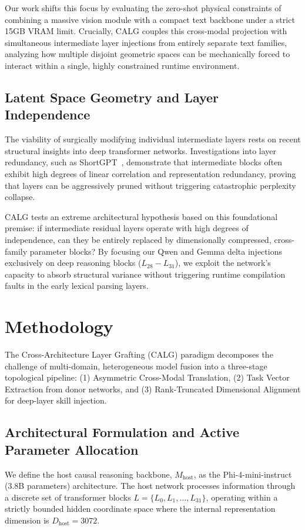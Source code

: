 \documentclass[11pt]{article}
\begin{document}
Our work shifts this focus by evaluating the zero-shot physical constraints of combining a massive vision module with a compact text backbone under a strict 15GB VRAM limit. Crucially, CALG couples this cross-modal projection with simultaneous intermediate layer injections from entirely separate text families, analyzing how multiple disjoint geometric spaces can be mechanically forced to interact within a single, highly constrained runtime environment.

\subsection{Latent Space Geometry and Layer Independence}
The viability of surgically modifying individual intermediate layers rests on recent structural insights into deep transformer networks. Investigations into layer redundancy, such as ShortGPT~\cite{men2024shortgpt}, demonstrate that intermediate blocks often exhibit high degrees of linear correlation and representation redundancy, proving that layers can be aggressively pruned without triggering catastrophic perplexity collapse. 

CALG tests an extreme architectural hypothesis based on this foundational premise: if intermediate residual layers operate with high degrees of independence, can they be entirely replaced by dimensionally compressed, cross-family parameter blocks? By focusing our Qwen and Gemma delta injections exclusively on deep reasoning blocks ($L_{28} - L_{31}$), we exploit the network's capacity to absorb structural variance without triggering runtime compilation faults in the early lexical parsing layers.

\section{Methodology}
The Cross-Architecture Layer Grafting (CALG) paradigm decomposes the challenge of multi-domain, heterogeneous model fusion into a three-stage topological pipeline: (1) Asymmetric Cross-Modal Translation, (2) Task Vector Extraction from donor networks, and (3) Rank-Truncated Dimensional Alignment for deep-layer skill injection.

\subsection{Architectural Formulation and Active Parameter Allocation}
We define the host causal reasoning backbone, $M_{\text{host}}$, as the Phi-4-mini-instruct (3.8B parameters) architecture. The host network processes information through a discrete set of transformer blocks $L = \{L_0, L_1, \dots, L_{31}\}$, operating within a strictly bounded hidden coordinate space where the internal representation dimension is $D_{\text{host}} = 3072$.
\end{document}
